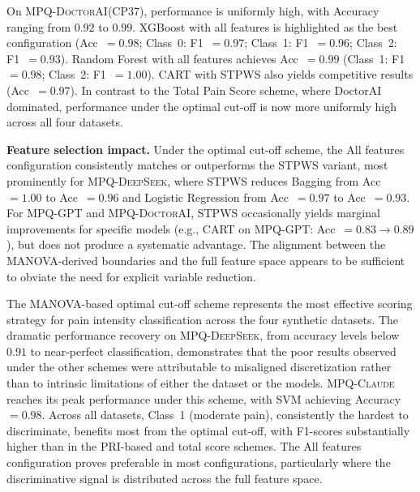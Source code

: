 \documentclass[preprint,12pt,authoryear]{elsarticle}
\newcommand{\dbGPT}{\small\textsc{MPQ-GPT}\xspace}
\newcommand{\dbClaude}{\small\textsc{MPQ-Claude}\xspace}
\newcommand{\dbDeepSeek}{\small\textsc{MPQ-DeepSeek}\xspace}
\newcommand{\dbDoctorAI}{\small\textsc{MPQ-DoctorAI}\xspace}
\begin{document}
On \dbDoctorAI (CP37), performance is uniformly high, with Accuracy ranging from $0.92$ to $0.99$. XGBoost with all features is highlighted as the best configuration (Acc~$= 0.98$; Class~0: F1~$= 0.97$; Class~1: F1~$= 0.96$; Class~2: F1~$= 0.93$). Random Forest with all features achieves Acc~$= 0.99$ (Class~1: F1~$= 0.98$; Class~2: F1~$= 1.00$). CART with STPWS also yields competitive results (Acc~$= 0.97$). In contrast to the Total Pain Score scheme, where DoctorAI dominated, performance under the optimal cut-off is now more uniformly high across all four datasets.

\textbf{Feature selection impact.}
Under the optimal cut-off scheme, the All features configuration consistently matches or outperforms the STPWS variant, most prominently for \dbDeepSeek, where STPWS reduces Bagging from Acc~$= 1.00$ to Acc~$= 0.96$ and Logistic Regression from Acc~$= 0.97$ to Acc~$= 0.93$. For \dbGPT and \dbDoctorAI, STPWS occasionally yields marginal improvements for specific models (e.g., CART on \dbGPT: Acc~$= 0.83 \to 0.89$), but does not produce a systematic advantage. The alignment between the MANOVA-derived boundaries and the full feature space appears to be sufficient to obviate the need for explicit variable reduction.

The MANOVA-based optimal cut-off scheme represents the most effective scoring strategy for pain intensity classification across the four synthetic datasets. The dramatic performance recovery on \dbDeepSeek, from accuracy levels below $0.91$ to near-perfect classification, demonstrates that the poor results observed under the other schemes were attributable to misaligned discretization rather than to intrinsic limitations of either the dataset or the models. \dbClaude reaches its peak performance under this scheme, with SVM achieving Accuracy~$= 0.98$. Across all datasets, Class~1 (moderate pain),  consistently the hardest to discriminate, benefits most from the optimal cut-off, with F1-scores substantially higher than in the PRI-based and total score schemes. The All features configuration proves preferable in most configurations, particularly where the discriminative signal is distributed across the full feature space.
\end{document}
